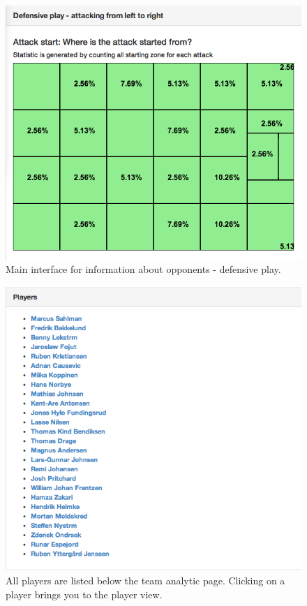 \begin{figure}[ht!]
\centering
\includegraphics[width=1\textwidth]{images/general/team_analysis3.png}
\caption{Main interface for information about opponents - defensive play.}
\label{fig:team_analysis3}
\end{figure}

\begin{figure}[ht!]
\centering
\includegraphics[width=1\textwidth]{images/general/team_analysis4.png}
\caption{All players are listed below the team analytic page. Clicking on a player brings you to the player view.}
\label{fig:team_analysis4}
\end{figure}

